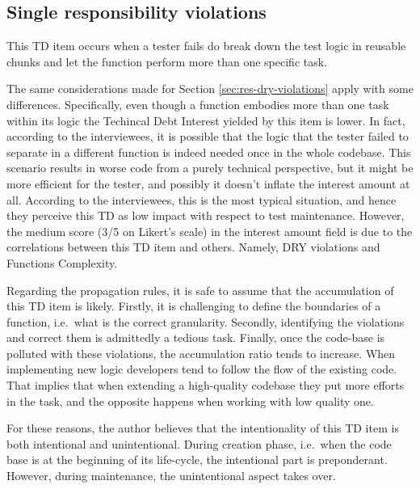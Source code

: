     \subsection{Single responsibility violations} \label{sec:res-single-responsability-vilation}

    This TD item occurs when a tester fails do break down the test logic in reusable chunks and let the function perform more than one specific task.

    The same considerations made for Section \ref{sec:res-dry-violations} apply with some differences. Specifically, even though a function embodies more than one task within its logic the Techincal Debt Interest yielded by this item is lower. In fact, according to the interviewees, it is possible that the logic that the tester failed to separate in a different function is indeed needed once in the whole codebase. This scenario results in worse code from a purely technical perspective, but it might be more efficient for the tester, and possibly it doesn't inflate the interest amount at all. According to the interviewees, this is the most typical situation, and hence they perceive this TD as low impact with respect to test maintenance.  \label{sec:disc-rq3-single-responsibility} However, the medium score (3/5 on Likert's scale) in the interest amount field is due to the correlations between this TD item and others. Namely, DRY violations and Functions Complexity.

    Regarding the propagation rules, it is safe to assume that the accumulation of this TD item is likely. Firstly, it is challenging to define the boundaries of a function, i.e.\ what is the correct granularity. Secondly, identifying the violations and correct them is admittedly a tedious task. Finally, once the code-base is polluted with these violations, the accumulation ratio tends to increase. When implementing new logic developers tend to follow the flow of the existing code. That implies that when extending a high-quality codebase they put more efforts in the task, and the opposite happens when working with low quality one.

    For these reasons, the author believes that the intentionality of this TD item is both intentional and unintentional. During creation phase, i.e.\ when the code base is at the beginning of its life-cycle, the intentional part is preponderant. However, during maintenance, the unintentional aspect takes over.


